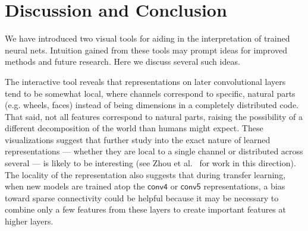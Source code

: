 \documentclass{article}
\newcommand{\layer}[1]{\ensuremath{\mathsf{#1}\xspace}}
\begin{document}
\section{Discussion and Conclusion}

We have introduced two visual tools for aiding in the interpretation
of trained neural nets.
Intuition gained from these tools may prompt ideas for improved methods and future research. Here we discuss several such ideas.

The interactive tool reveals that representations on later convolutional layers tend to be somewhat local, where channels correspond to specific, natural parts (e.g. wheels, faces) instead of being dimensions in a completely distributed code. That said, not all features correspond to natural parts, raising the possibility of a different decomposition of the world than humans might expect. These visualizations suggest that further study into the exact nature of learned representations --- whether they are local to a single channel or distributed across several --- is likely to be interesting (see Zhou et al.~ for work in this direction). The locality of the representation also suggests that during transfer learning, when new models are trained atop the \layer{conv4} or \layer{conv5} representations, a bias toward sparse connectivity could be helpful because it may be necessary to combine only a few features from these layers to create important features at higher layers.
\end{document}
